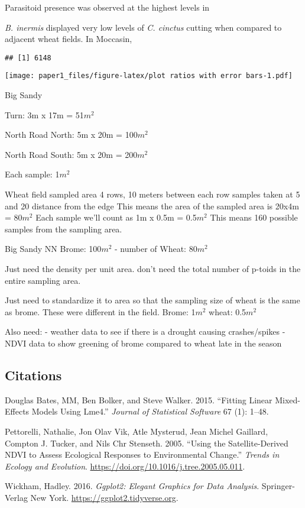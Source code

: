 \documentclass[
]{article}
\newlength{\cslhangindent}
\newenvironment{CSLReferences}[2] %
 {\begin{list}{}{%
  \setlength{\itemindent}{0pt}
  \setlength{\leftmargin}{0pt}
  \setlength{\parsep}{0pt}
  \ifodd #1
   \setlength{\leftmargin}{\cslhangindent}
   \setlength{\itemindent}{-1\cslhangindent}
  \fi
  \setlength{\itemsep}{#2\baselineskip}}}
 {\end{list}}
\begin{document}
Parasitoid presence was observed at the highest levels in

\emph{B. inermis} displayed very low levels of \emph{C. cinctus} cutting
when compared to adjacent wheat fields. In Moccasin,

\begin{verbatim}
## [1] 6148
\end{verbatim}

\texttt{[image: paper1\_files/figure-latex/plot ratios with error bars-1.pdf]}

Big Sandy

Turn: 3m x 17m = 51\(m^2\)

North Road North: 5m x 20m = 100\(m^2\)

North Road South: 5m x 20m = 200\(m^2\)

Each sample: 1\(m^2\)

Wheat field sampled area 4 rows, 10 meters between each row samples
taken at 5 and 20 distance from the edge This means the area of the
sampled area is 20x4m = 80\(m^2\) Each sample we'll count as 1m x 0.5m =
0.5\(m^2\) This means 160 possible samples from the sampling area.

Big Sandy NN Brome: 100\(m^2\) - number of Wheat: 80\(m^2\)

Just need the density per unit area. don't need the total number of
p-toids in the entire sampling area.

Just need to standardize it to area so that the sampling size of wheat
is the same as brome. These were different in the field. Brome: 1\(m^2\)
wheat: 0.5\(m^2\)

Also need: - weather data to see if there is a drought causing
crashes/spikes - NDVI data to show greening of brome compared to wheat
late in the season

\subsection*{Citations}\label{citations}

\label{refs}
\begin{CSLReferences}{1}{0}
Douglas Bates, MM, Ben Bolker, and Steve Walker. 2015. {``Fitting Linear
Mixed-Effects Models Using Lme4.''} \emph{Journal of Statistical
Software} 67 (1): 1--48.

Pettorelli, Nathalie, Jon Olav Vik, Atle Mysterud, Jean Michel Gaillard,
Compton J. Tucker, and Nils Chr Stenseth. 2005. {``Using the
Satellite-Derived NDVI to Assess Ecological Responses to Environmental
Change.''} \emph{Trends in Ecology and Evolution}.
\url{https://doi.org/10.1016/j.tree.2005.05.011}.

Wickham, Hadley. 2016. \emph{Ggplot2: Elegant Graphics for Data
Analysis}. Springer-Verlag New York.
\url{https://ggplot2.tidyverse.org}.

\end{CSLReferences}
\end{document}

